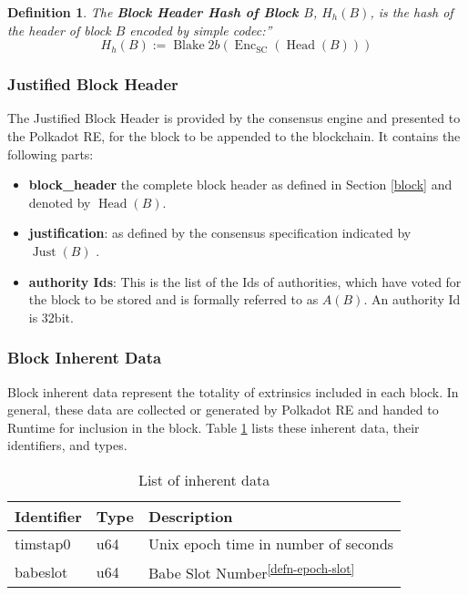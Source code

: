 \documentclass{book}
\newcommand{\assign}{:=}
\newcommand{\tmop}[1]{\ensuremath{\operatorname{#1}}}
\newcommand{\tmrsup}[1]{\textsuperscript{#1}}
\newcommand{\tmsamp}[1]{\textsf{#1}}
\newcommand{\tmstrong}[1]{\textbf{#1}}
\newcommand{\tmtextbf}[1]{{\bfseries{#1}}}
\newcommand{\tmtextsf}[1]{{\sffamily{#1}}}
\newtheorem{definition}{Definition}
\providecommand{\tmop}[1]{\ensuremath{\mathrm{#1}}}
\providecommand{\tmsamp}[1]{\tmtextsf{#1}}
\providecommand{\tmstrong}[1]{\tmtextbf{#1}}
\providecommand{\tmtextbf}[1]{\tmtextbf{#1}}
\newtheorem{definition}{Definition}
\begin{document}
\begin{definition}
  \label{defn-block-header-hash}The {\tmstrong{Block Header Hash of Block
  $B$}}, {\tmstrong{$H_h (B)$}}, is the hash of the header of block $B$
  encoded by simple codec:''
  \[ H_h (B) \assign \tmop{Blake} 2 b (\tmop{Enc}_{\tmop{SC}} (\tmop{Head}
     (B))) \]
\end{definition}

\subsubsection{Justified Block Header}

The Justified Block Header is provided by the consensus engine and presented
to the Polkadot RE, for the block to be appended to the blockchain. It
contains the following parts:
\begin{itemize}
  \item {\tmstrong{{\tmsamp{{\tmstrong{block\_header}}}}}} the complete block
  header as defined in Section \ref{block} and denoted by $\tmop{Head} (B)$.
  
  \item {\tmstrong{{\tmsamp{justification}}}}: as defined by the consensus
  specification indicated by $\tmop{Just} (B)$ {}.
  
  \item {\tmstrong{{\tmsamp{authority Ids}}}}: This is the list of the Ids of
  authorities, which have voted for the block to be stored and is formally
  referred to as $A (B)$. An authority Id is 32bit.
\end{itemize}

\subsubsection{Block Inherent Data}

Block inherent data represent the totality of extrinsics included in each
block. In general, these data are collected or generated by Polkadot RE and
handed to Runtime for inclusion in the block. Table \ref{tabl-inherent-data}
lists these inherent data, their identifiers, and types.

\begin{table}[h]
  \begin{tabular}{lll}
    \hline
    Identifier & Type  & Description\\
    \hline
    timstap0 & u64 & Unix epoch time in number of seconds\\
    babeslot & u64 & Babe Slot Number\tmrsup{\ref{defn-epoch-slot}}\\
    \hline
  \end{tabular}
  \caption{\label{tabl-inherent-data}List of inherent data}
\end{table}
\end{document}
